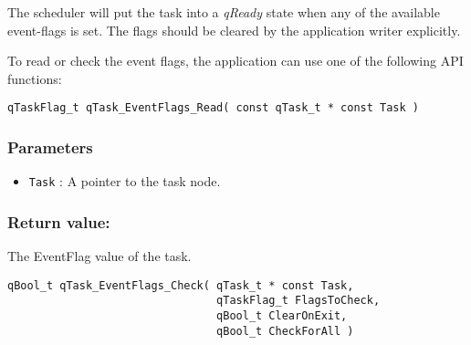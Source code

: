 \begin{tcolorbox}
\HandRight The scheduler will put the task into a \textit{qReady} state when any of the available event-flags is set. The flags should be cleared by the application writer explicitly. 
\end{tcolorbox}

To read or check the event flags, the application can use one of the following API functions: 
\medskip

\begin{lstlisting}[style=CStyle]
qTaskFlag_t qTask_EventFlags_Read( const qTask_t * const Task )
\end{lstlisting} 

\subsubsection*{Parameters}
\begin{itemize}
    \item \lstinline{Task} : A pointer to the task node.
\end{itemize}

\subsubsection*{Return value:}

The EventFlag value of the task.

\noindent\hrulefill
\medskip

\begin{lstlisting}[style=CStyle]
qBool_t qTask_EventFlags_Check( qTask_t * const Task, 
                                qTaskFlag_t FlagsToCheck, 
                                qBool_t ClearOnExit, 
                                qBool_t CheckForAll )
\end{lstlisting} 

